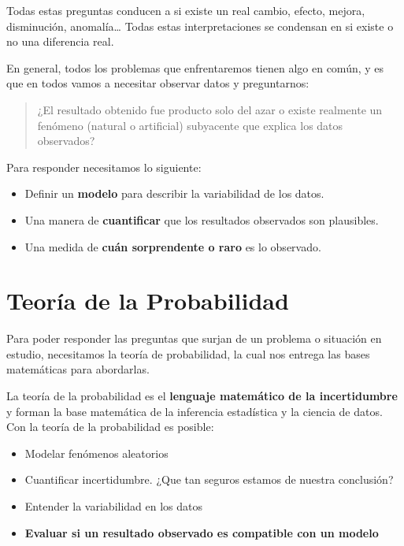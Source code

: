 \documentclass[
  letterpaper,
  DIV=11,
  numbers=noendperiod]{scrreprt}
\providecommand{\tightlist}{%
  \setlength{\itemsep}{0pt}\setlength{\parskip}{0pt}}
\begin{document}
Todas estas preguntas conducen a si existe un real cambio, efecto,
mejora, disminución, anomalía\ldots{} Todas estas interpretaciones se
condensan en si existe o no una diferencia real.

En general, todos los problemas que enfrentaremos tienen algo en común,
y es que en todos vamos a necesitar observar datos y preguntarnos:

\begin{quote}
¿El resultado obtenido fue producto solo del azar o existe realmente un
fenómeno (natural o artificial) subyacente que explica los datos
observados?
\end{quote}

Para responder necesitamos lo siguiente:

\begin{itemize}
\tightlist
\item
  Definir un \textbf{modelo} para describir la variabilidad de los
  datos.
\item
  Una manera de \textbf{cuantificar} que los resultados observados son
  plausibles.
\item
  Una medida de \textbf{cuán sorprendente o raro} es lo observado.
\end{itemize}

\section{Teoría de la Probabilidad}\label{teoruxeda-de-la-probabilidad}

Para poder responder las preguntas que surjan de un problema o situación
en estudio, necesitamos la teoría de probabilidad, la cual nos entrega
las bases matemáticas para abordarlas.

La teoría de la probabilidad es el \textbf{lenguaje matemático de la
incertidumbre} y forman la base matemática de la inferencia estadística
y la ciencia de datos. Con la teoría de la probabilidad es posible:

\begin{itemize}
\tightlist
\item
  Modelar fenómenos aleatorios
\item
  Cuantificar incertidumbre. ¿Que tan seguros estamos de nuestra
  conclusión?
\item
  Entender la variabilidad en los datos
\item
  \textbf{Evaluar si un resultado observado es compatible con un modelo}
\end{itemize}
\end{document}
